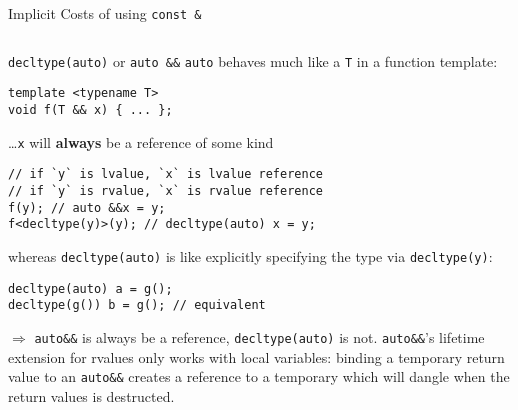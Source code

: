 \begin{frame}[fragile]{Implicit Costs of using \texttt{const \&}}
    \begin{columns}[t]
        \begin{column}{.45\textwidth}
        \end{column}
        \begin{column}{.45\textwidth}
        \end{column}
    \end{columns}
\end{frame}

\begin{frame}[fragile]{\texttt{decltype(auto)} or \texttt{auto \&\&}}
    \texttt{auto} behaves much like a \texttt{T} in a function template:
    \begin{lstlisting}
template <typename T>
void f(T && x) { ... };
    \end{lstlisting}
    \ldots \texttt{x} will \textbf{always} be a reference of some kind
    \begin{lstlisting}
// if `y` is lvalue, `x` is lvalue reference
// if `y` is rvalue, `x` is rvalue reference
f(y); // auto &&x = y;
f<decltype(y)>(y); // decltype(auto) x = y;
    \end{lstlisting}
    whereas \texttt{decltype(auto)} is like explicitly specifying the type via \texttt{decltype(y)}:
    \begin{lstlisting}
decltype(auto) a = g();
decltype(g()) b = g(); // equivalent
    \end{lstlisting}

    $\Rightarrow$ \texttt{auto\&\&} is always be a reference, \texttt{decltype(auto)} is not. \texttt{auto\&\&}'s lifetime extension for rvalues only works with local variables: binding a temporary return value to an \texttt{auto\&\&} creates a reference to a temporary which will dangle when the return values is destructed. 
\end{frame}
